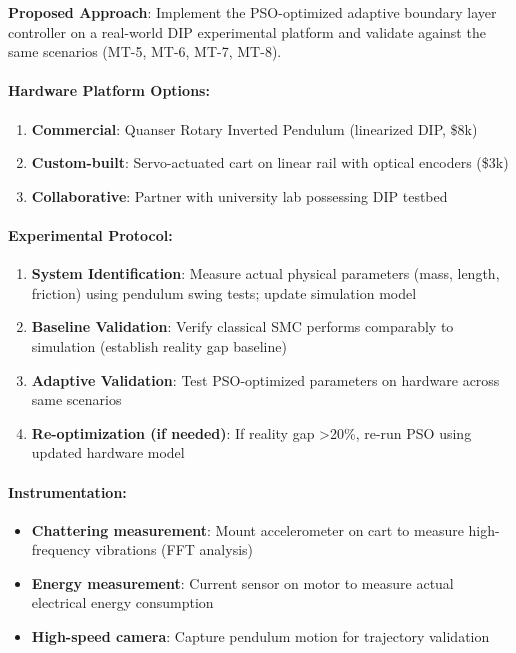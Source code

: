 \textbf{Proposed Approach}: Implement the PSO-optimized adaptive boundary layer controller on a real-world DIP experimental platform and validate against the same scenarios (MT-5, MT-6, MT-7, MT-8).

\paragraph{Hardware Platform Options:}
\begin{enumerate}
    \item \textbf{Commercial}: Quanser Rotary Inverted Pendulum (linearized DIP, \$8k)
    \item \textbf{Custom-built}: Servo-actuated cart on linear rail with optical encoders (\$3k)
    \item \textbf{Collaborative}: Partner with university lab possessing DIP testbed
\end{enumerate}

\paragraph{Experimental Protocol:}
\begin{enumerate}
    \item \textbf{System Identification}: Measure actual physical parameters (mass, length, friction) using pendulum swing tests; update simulation model
    \item \textbf{Baseline Validation}: Verify classical SMC performs comparably to simulation (establish reality gap baseline)
    \item \textbf{Adaptive Validation}: Test PSO-optimized parameters on hardware across same scenarios
    \item \textbf{Re-optimization (if needed)}: If reality gap >20\%, re-run PSO using updated hardware model
\end{enumerate}

\paragraph{Instrumentation:}
\begin{itemize}
    \item \textbf{Chattering measurement}: Mount accelerometer on cart to measure high-frequency vibrations (FFT analysis)
    \item \textbf{Energy measurement}: Current sensor on motor to measure actual electrical energy consumption
    \item \textbf{High-speed camera}: Capture pendulum motion for trajectory validation
\end{itemize}

